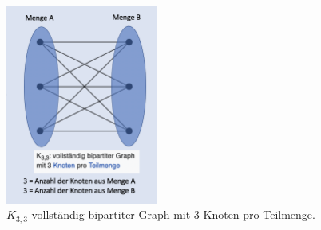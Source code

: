 \begin{figure}
\centering
\includegraphics[width=5cm]{papers/munkres/figures/bipartiter_graph}
\caption{$K_{3,3}$ vollständig bipartiter Graph mit 3 Knoten pro Teilmenge.}
\label{munkres:Vr2}
\end{figure}

